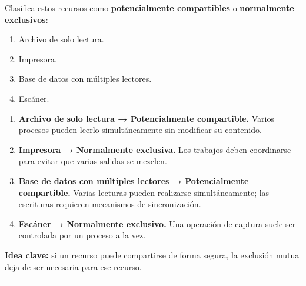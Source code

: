 \documentclass[
  spanish,
  letterpaper,
]{scrbook}
\providecommand{\tightlist}{%
  \setlength{\itemsep}{0pt}\setlength{\parskip}{0pt}}
\begin{document}
Clasifica estos recursos como \textbf{potencialmente compartibles} o
\textbf{normalmente exclusivos}:

\begin{enumerate}
\def\labelenumi{\arabic{enumi}.}
\tightlist
\item
  Archivo de solo lectura.
\item
  Impresora.
\item
  Base de datos con múltiples lectores.
\item
  Escáner.
\end{enumerate}

\begin{tcolorbox}[enhanced jigsaw, arc=.35mm, bottomrule=.15mm, bottomtitle=1mm, breakable, colback=white, colbacktitle=quarto-callout-tip-color!10!white, colframe=quarto-callout-tip-color-frame, coltitle=black, left=2mm, leftrule=.75mm, opacityback=0, opacitybacktitle=0.6, rightrule=.15mm, title=\textcolor{quarto-callout-tip-color}{\faLightbulb}\hspace{0.5em}{✅ Ver solución}, titlerule=0mm, toprule=.15mm, toptitle=1mm]

\begin{enumerate}
\def\labelenumi{\arabic{enumi}.}
\tightlist
\item
  \textbf{Archivo de solo lectura → Potencialmente compartible.} Varios
  procesos pueden leerlo simultáneamente sin modificar su contenido.
\item
  \textbf{Impresora → Normalmente exclusiva.} Los trabajos deben
  coordinarse para evitar que varias salidas se mezclen.
\item
  \textbf{Base de datos con múltiples lectores → Potencialmente
  compartible.} Varias lecturas pueden realizarse simultáneamente; las
  escrituras requieren mecanismos de sincronización.
\item
  \textbf{Escáner → Normalmente exclusivo.} Una operación de captura
  suele ser controlada por un proceso a la vez.
\end{enumerate}

\textbf{Idea clave:} si un recurso puede compartirse de forma segura, la
exclusión mutua deja de ser necesaria para ese recurso.

\end{tcolorbox}

\begin{center}\rule{0.5\linewidth}{0.5pt}\end{center}

\end{document}
